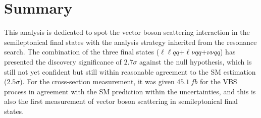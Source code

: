 \section{Summary}
This analysis is dedicated to spot the vector boson scattering interaction in the semileptonical final states with the analysis strategy inherited from the resonance search. The combination of the three final states ($\ell\ell qq$+$\ell\nu qq$+$\nu\nu qq$) has presented the discovery significance of $2.7\sigma$  against the null hypothesis, which is still not yet confident but still within reasonable agreement to the SM estimation ($2.5\sigma$). For the cross-section measurement, it was given $45.1~fb$ for the VBS process in agreement with the SM prediction within the uncertainties, and this is also the first measurement of vector boson scattering in semileptonical final states. 